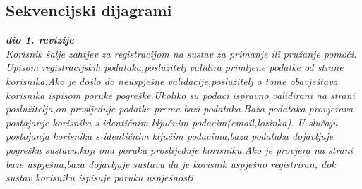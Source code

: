 \newpage

\subsection{Sekvencijski dijagrami}

\textbf{\textit{dio 1. revizije}}\\

\newline\newline\textit {Korisnik šalje zahtjev za registracijom na sustav za primanje ili pružanje pomoći.
	Upisom registracijskih podataka,poslužitelj validira primljene podatke od strane
	korisnika.Ako je došlo do neuspješne validacije,poslužitelj o tome obavještava 
	korisnika ispisom poruke pogreške.Ukoliko su podaci ispravno validirani na
	strani poslužitelja,on prosljeđuje podatke prema bazi podataka.Baza podataka
	provjerava postajanje korisnika s identičnim ključnim podacim(email,lozinka).
	U slučaju postojanja korisnika s identičnim ključim podacima,baza podataka
	dojavljuje pogrešku sustavu,koji ona poruku proslijeđuje korisniku.Ako je provjera
	na strani baze uspješna,baza dojavljuje sustavu da je korisnik uspješno registriran,
	dok sustav korisniku ispisuje poruku uspješnosti.}\\


